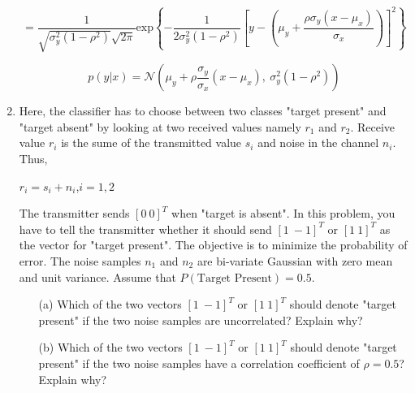 \documentclass[fleqn]{article}
\begin{document}
\begin{enumerate}
		\begin{equation*}		
			= \frac{1}{\sqrt{\sigma_y^2(1-\rho^2)}\sqrt{2\pi}}\text{exp}\left\{-\frac{1}{2\sigma_y^2(1-\rho^2)}\left[y - \left(\mu_y + \frac{\rho\sigma_y(x-\mu_x)}{\sigma_x}\right)\right]^2\right\}
		\end{equation*}
		
		\begin{equation*}
			p(y|x) = \mathcal{N}\left(\mu_y + \rho\frac{\sigma_y}{\sigma_x}(x-\mu_x),\:\sigma_y^2(1 - \rho^2)\right)
		\end{equation*}
		
		\item Here, the classifier has to choose between two classes "target present" and "target absent" by looking at two received values namely $r_1$ and $r_2$. Receive value $r_i$ is the sume of the transmitted value $s_i$ and noise in the channel $n_i$. Thus,
		
		$r_i = s_i + n_i$,\quad$i=1,2$
		
		The transmitter sends $[0 \: 0]^T$ when "target is absent". In this problem, you have to tell the transmitter whether it should send $[1 \: -1]^T$ or $[1 \: 1]^T$ as the vector for "target present". The objective is to minimize the probability of error. The noise samples $n_1$ and $n_2$ are bi-variate Gaussian with zero mean and unit variance. Assume that $P(\text{Target Present}) = 0.5$.
		
		\begin{enumerate}
			\item[(a)] Which of the two vectors $[1 \: -1]^T$ or $[1 \: 1]^T$ should denote "target present" if the two noise samples are uncorrelated? Explain why?
			
			\item[(b)] Which of the two vectors $[1 \: -1]^T$ or $[1 \: 1]^T$ should denote "target present" if the two noise samples have a correlation coefficient of $\rho = 0.5$? Explain why?
		\end{enumerate}
	\end{enumerate}
\end{document}
